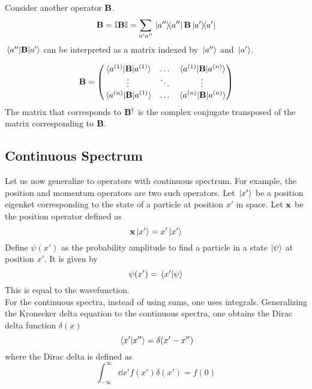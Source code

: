 \documentclass[12pt,a4paper,titlepage]{article}
\begin{document}
Consider another operator $\vb{B}$.
\begin{equation}
\vb{B}=\mathbb{I}\vb{B}\mathbb{I}=\sum_{a'a''}\op*{a''}{a''}\vb{B}\op*{a'}{a'}
\end{equation}
$\mel*{a''}{\vb{B}}{a'}$ can be interpreted as a matrix indexed by $\ket*{a''}$ and $\ket*{a'}$.

\begin{equation}
\vb{B}=\mqty(\mel*{a^{(1)}}{\vb{B}}{a^{(1)}} & \ldots & \mel*{a^{(1)}}{\vb{B}}{a^{(n)}} \\ \vdots & \ddots & \vdots \\ \mel*{a^{(n)}}{\vb{B}}{a^{(1)}} & \ldots & \mel*{a^{(n)}}{\vb{B}}{a^{(n)}})
\end{equation}
The matrix that corresponds to $\vb{B}^{\dagger}$ is the complex conjugate transposed of the matrix corresponding to $\vb{B}$.

\subsection{Continuous Spectrum}
Let us now generalize to operators with continuous spectrum. For example, the position and momentum operators are two such operators. Let $\ket*{x'}$ be a position eigenket corresponding to the state of a particle at position $x'$ in space. Let $\vb{x}$ be the position operator defined as
\begin{equation}
\vb{x}\ket*{x'}=x'\ket*{x'}
\end{equation}
Define $\psi(x')$ as the probability amplitude to find a particle in a state $\ket{\psi}$ at position $x'$. It is given by
\begin{equation}
\psi(x')=\ip*{x'}{\psi}
\end{equation}
This is equal to the wavefunction.\\

For the continuous spectra, instead of using sums, one uses integrals. Generalizing the Kronecker delta equation to the continuous spectra, one obtains the Dirac delta function $\delta(x)$
\begin{equation}
\ip*{x'}{x''}=\delta(x'-x'')
\end{equation}
where the Dirac delta is defined as
\begin{equation}
\int_{-\infty}^{\infty}\dd{x'}f(x')\delta(x')=f(0)
\end{equation}

\end{document}
